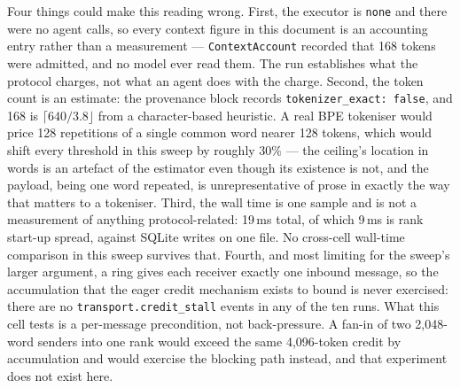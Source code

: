 \documentclass[11pt]{article}
\begin{document}
Four things could make this reading wrong. First, the executor is \texttt{none} and
there were no agent calls, so every context figure in this document is an accounting
entry rather than a measurement --- \texttt{ContextAccount} recorded that 168 tokens
were admitted, and no model ever read them. The run establishes what the protocol
charges, not what an agent does with the charge. Second, the token count is an
estimate: the provenance block records \texttt{tokenizer\_exact: false}, and 168 is
$\lceil 640/3.8 \rfloor$ from a character-based heuristic. A real BPE tokeniser would
price 128 repetitions of a single common word nearer 128 tokens, which would shift
every threshold in this sweep by roughly 30\% --- the ceiling's location in words is
an artefact of the estimator even though its existence is not, and the payload,
being one word repeated, is unrepresentative of prose in exactly the way that
matters to a tokeniser. Third, the wall time is one sample and is not a measurement
of anything protocol-related: 19\,ms total, of which 9\,ms is rank start-up spread,
against SQLite writes on one file. No cross-cell wall-time comparison in this sweep
survives that. Fourth, and most limiting for the sweep's larger argument, a ring
gives each receiver exactly one inbound message, so the accumulation that the eager
credit mechanism exists to bound is never exercised: there are no
\texttt{transport.credit\_stall} events in any of the ten runs. What this cell tests
is a per-message precondition, not back-pressure. A fan-in of two 2{,}048-word
senders into one rank would exceed the same 4{,}096-token credit by accumulation and
would exercise the blocking path instead, and that experiment does not exist here.
\end{document}
